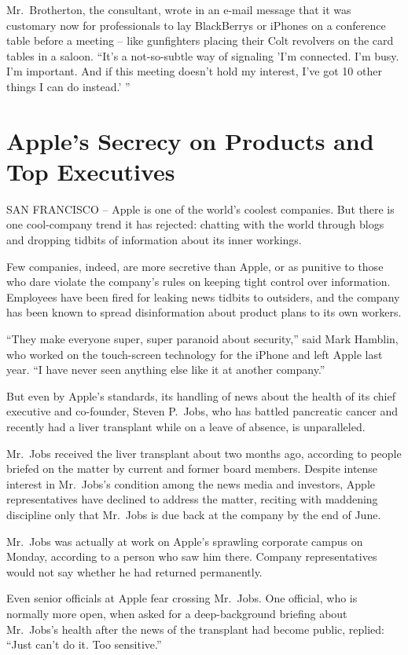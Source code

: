 ﻿\documentclass[12pt,a4paper,onecolumn]{article}
\begin{document}
Mr.~Brotherton, the consultant, wrote in an e-mail message that it was customary now for
professionals to lay BlackBerrys or iPhones on a conference table before a meeting -- like
gunfighters placing their Colt revolvers on the card tables in a saloon. ``It's a not-so-subtle way
of signaling 'I'm connected. I'm busy. I'm important. And if this meeting doesn't hold my interest,
I've got 10 other things I can do instead.' ''

\section{Apple's Secrecy on Products and Top Executives}

SAN FRANCISCO -- Apple is one of the world's coolest companies. But there is one cool-company trend
it has rejected: chatting with the world through blogs and dropping tidbits of information about its
inner workings.

Few companies, indeed, are more secretive than Apple, or as punitive to those who dare violate the
company's rules on keeping tight control over information. Employees have been fired for leaking
news tidbits to outsiders, and the company has been known to spread disinformation about product
plans to its own workers.

``They make everyone super, super paranoid about security,'' said Mark Hamblin, who worked on the
touch-screen technology for the iPhone and left Apple last year. ``I have never seen anything else
like it at another company.''

But even by Apple's standards, its handling of news about the health of its chief executive and
co-founder, Steven P.~Jobs, who has battled pancreatic cancer and recently had a liver transplant
while on a leave of absence, is unparalleled.

Mr.~Jobs received the liver transplant about two months ago, according to people briefed on the
matter by current and former board members. Despite intense interest in Mr.~Jobs's condition among
the news media and investors, Apple representatives have declined to address the matter, reciting
with maddening discipline only that Mr.~Jobs is due back at the company by the end of June.

Mr.~Jobs was actually at work on Apple's sprawling corporate campus on Monday, according to a person
who saw him there. Company representatives would not say whether he had returned permanently.

Even senior officials at Apple fear crossing Mr.~Jobs. One official, who is normally more open, when
asked for a deep-background briefing about Mr.~Jobs's health after the news of the transplant had
become public, replied: ``Just can't do it. Too sensitive.''
\end{document}
